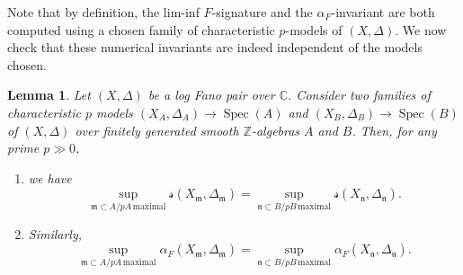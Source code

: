 \documentclass[11pt,reqno]{amsart}
\newcommand{\C}{\mathbb{C}}
\newcommand{\Q}{\mathbb{Q}}
\newcommand{\Z}{\mathbb{Z}}
\newcommand{\fm}{\mathfrak{m}}
\DeclareMathOperator{\Spec}{Spec}
\numberwithin{equation}{section}
\newtheorem{lem}[prop] {Lemma}
\theoremstyle{definition}
\newtheorem{defi}[prop] {Definition}
\newcommand{\FA}{\alpha_{F}}
\newcommand{\s}{\mathscr{s}}
\begin{document}


Note that by definition, the lim-inf $F$-signature and the $\FA$-invariant are both computed using a chosen family of characteristic $p$-models of $(X,\Delta)$. We now check that these numerical invariants are indeed independent of the models chosen.

\begin{lem}
    Let $(X, \Delta)$ be a log Fano pair over $\C$. Consider two families of characteristic $p$ models $(X_A, \Delta_A) \to \Spec(A)$ and $(X_B, \Delta_B) \to \Spec(B)$ of $(X, \Delta)$ over finitely generated smooth $\Z$-algebras $A$ and $B$. Then, for any prime $p \gg 0$,
    \begin{enumerate}
        \item we have
\[ \sup_{ \fm \subset A/pA \,  \text{maximal} } \s(X_{\fm}, \Delta_\fm)  = \sup_{ \mathfrak{n} \subset B/pB \,  \text{maximal} } \s(X_{\mathfrak{n}}, \Delta_\mathfrak{n}). \]
        \item Similarly,
        \[  \sup_{ \fm \subset A/pA \, \text{maximal} } \alpha_{F}(X_{\fm}, \Delta_\fm) = \sup_{ \mathfrak{n} \subset B/pB \, \text{maximal} } \alpha_{F}(X_{\mathfrak{n}}, \Delta_\mathfrak{n}).  \]
    \end{enumerate}
\end{lem}
\end{document}
